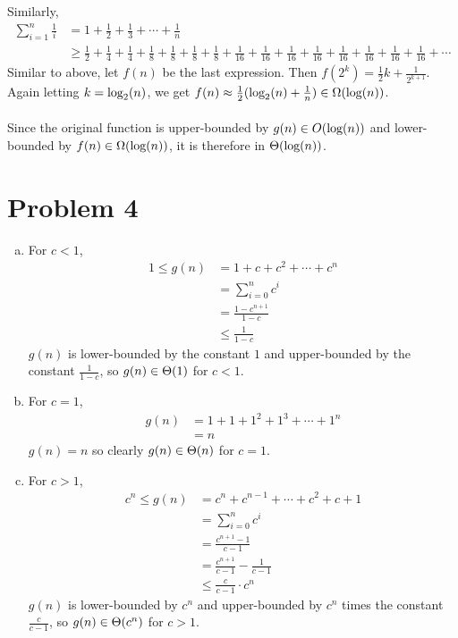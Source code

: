 \documentclass[11pt]{article}
\newcounter{problemnumber}
\let\origleft\left
\let\origright\right
\renewcommand{\left}{\mathopen{}\mathclose\bgroup\origleft}
\renewcommand{\right}{\aftergroup\egroup\origright}
\newcommand{\p}[1]{\left(#1\right)}
\renewcommand{\log}[1]{\text{log}\p{#1}}
\newcommand{\logb}[2]{\text{log}_{#1}\p{#2}}
\newcommand{\BigOh}[1]{O\p{#1}}
\newcommand{\BigOmega}[1]{\Omega\p{#1}}
\newcommand{\BigTheta}[1]{\Theta\p{#1}}
\begin{document}
\begin{enumerate}[1.]
Similarly,
\begin{align*}
\sum_{i=1}^n \frac 1i &= 1 + \frac12 + \frac13 + \cdots + \frac1n \\
&\geq \frac12+\frac14+\frac14+\frac18+\frac18+\frac18+\frac18+\frac1{16}+\frac1{16}+\frac1{16}+\frac1{16}+\frac1{16}+\frac1{16}+\frac1{16}+\frac1{16}+\cdots
\end{align*}
Similar to above, let $f(n)$ be the last expression. Then $f(2^k) = \frac12 k + \frac1{2^{k+1}}$. Again letting $k=\logb2n$, we get $f(n) \approx \frac12(\logb2n + \frac1n) \in \BigOmega{\log n}$. \\\\
Since the original function is upper-bounded by $g(n) \in \BigOh{\log n}$ and lower-bounded by $f(n) \in \BigOmega{\log n}$, it is therefore in $\BigTheta{\log n}$.
\end{enumerate}


\newpage
\section*{Problem 4}
\begin{enumerate}[a)]
\item For $c<1$,
\begin{align*}
1 \leq g(n) &= 1 + c + c^2 + \cdots + c^n \\
&= \sum_{i=0}^n c^i \\
&= \frac{1-c^{n+1}}{1-c} \\
&\leq \frac1{1-c}
\end{align*}
$g(n)$ is lower-bounded by the constant $1$ and upper-bounded by the constant $\frac1{1-c}$, so $g(n) \in \BigTheta{1}$ for $c<1$.
\item For $c=1$,
\begin{align*}
g(n) &= 1 + 1 + 1^2 + 1^3 + \cdots + 1^n \\
&= n
\end{align*}
$g(n) = n$ so clearly $g(n) \in \BigTheta{n}$ for $c=1$.
\item For $c>1$,
\begin{align*}
c^n \leq g(n) &= c^n + c^{n-1} + \cdots + c^2 + c + 1 \\
&= \sum_{i=0}^n c^i \\
&= \frac{c^{n+1}-1}{c-1} \\
&= \frac{c^{n+1}}{c-1} - \frac1{c-1} \\
&\leq \frac c{c-1} \cdot c^n
\end{align*}
$g(n)$ is lower-bounded by $c^n$ and upper-bounded by $c^n$ times the constant $\frac c{c-1}$, so $g(n) \in \BigTheta{c^n}$ for $c>1$.
\end{enumerate}
\end{document}
